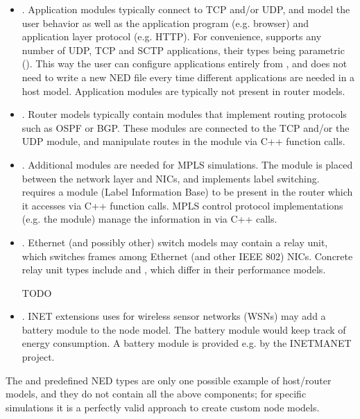 \begin{itemize}
\item \sloppypar {}. Application modules typically connect to TCP
and/or UDP, and model the user behavior as well as the application program
(e.g. browser) and application layer protocol (e.g. HTTP). For convenience,
 supports any number of UDP, TCP and SCTP
applications, their types being parametric (). This way the user can configure applications entirely from
, and does not need to write a new NED file every time
different applications are needed in a host model. Application modules
are typically not present in router models.

\item {}. Router models typically contain modules that
implement routing protocols such as OSPF or BGP. These modules are
connected to the TCP and/or the UDP module, and manipulate routes in the
 module via C++ function calls.

\item {}. Additional modules are needed for MPLS
simulations. The  module is placed between the network layer
and NICs, and implements label switching.  requires a
 module (Label Information Base) to be present in the router
which it accesses via C++ function calls. MPLS control protocol
implementations (e.g. the  module) manage the information in
 via C++ calls.

\item {}. Ethernet (and possibly other) switch models may
contain a relay unit, which switches frames among Ethernet (and other
IEEE 802) NICs. Concrete relay unit types include 
and , which differ in their performance models.

\ifdraft TODO
\item {}. INET extensions uses for wireless sensor
networks (WSNs) may add a battery module to the node model. The battery
module would keep track of energy consumption. A battery module is provided
e.g. by the INETMANET project.
\fi

\end{itemize}

The  and  predefined NED types are
only one possible example of host/router models, and they do not contain
all the above components; for specific simulations it is a perfectly
valid approach to create custom node models.


